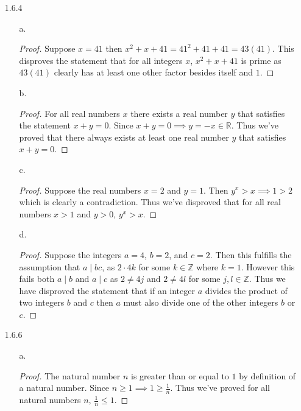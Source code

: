 \documentclass[11pt]{amsart}
\theoremstyle{definition}
\begin{document}
\begin{itemize}
\begin{itemize}
\end{itemize}

\item[1.6.4]
\begin{itemize}
    \item[a.] \begin{proof}
        Suppose $x=41$ then $x^2+x+41=41^2+41+41=43(41)$. This disproves the statement that for all integers $x$, $x^2+x+41$ is prime as $43(41)$ clearly has at least one other factor besides itself and $1$.
    \end{proof}

    \item[b.] \begin{proof}
        For all real numbers $x$ there exists a real number $y$ that satisfies the statement $x+y=0$. Since $x+y=0\implies y=-x\in\mathbb{R}$. Thus we've proved that there always exists at least one real number $y$ that satisfies $x+y=0$.
    \end{proof}

    \item[c.] \begin{proof}
        Suppose the real numbers $x=2$ and $y=1$. Then $y^x>x\implies 1>2$ which is clearly a contradiction. Thus we've disproved that for all real numbers $x>1$ and $y>0$, $y^x>x$.
    \end{proof}

    \item[d.] \begin{proof}
        Suppose the integers $a=4$, $b=2$, and $c=2$. Then this fulfills the assumption that $a\mid bc$, as $2\cdot 4k$ for some $k\in\mathbb{Z}$ where $k=1$. However this fails both $a\mid b$ and $a\mid c$ as $2\ne 4j$ and $2\ne 4l$ for some $j,l\in\mathbb{Z}$. Thus we have disproved the statement that if an integer $a$ divides the product of two integers $b$ and $c$ then $a$ must also divide one of the other integers $b$ or $c$.
    \end{proof}
    
\end{itemize}

\item[1.6.6]
\begin{itemize}
    \item[a.] \begin{proof}
        The natural number $n$ is greater than or equal to $1$ by definition of a natural number. Since $n\ge 1\implies 1\ge \frac 1n$. Thus we've proved for all natural numbers $n$, $\frac 1n\le 1$.
    \end{proof}


\end{itemize}
\end{itemize}
\end{document}
